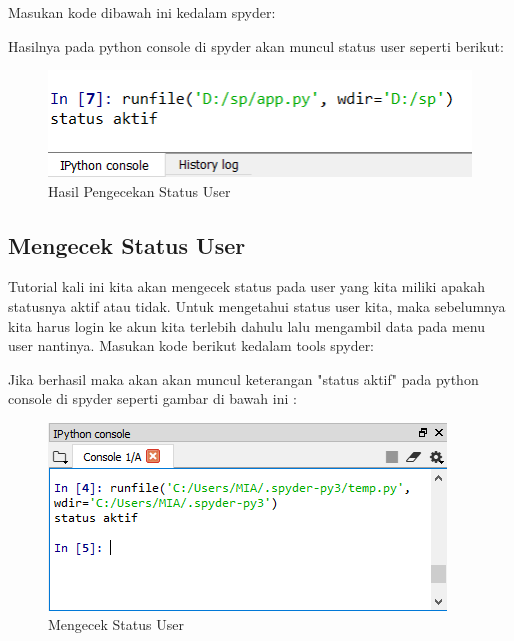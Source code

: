 Masukan kode dibawah ini kedalam spyder:


\newpage
Hasilnya pada python console di spyder akan muncul status user seperti berikut:
\begin{figure}[h]
	\centering
	\includegraphics[scale=0.7]{figures/9StatusUser}
	\caption{Hasil Pengecekan Status User}
\end{figure}

\newpage
\subsection{Mengecek Status User}
Tutorial kali ini kita akan mengecek status pada user yang kita miliki apakah statusnya aktif atau tidak. Untuk mengetahui status user kita, maka sebelumnya kita harus login ke akun kita terlebih dahulu lalu mengambil data pada menu user nantinya.
Masukan kode berikut kedalam tools spyder:


\newpage
Jika berhasil maka akan akan muncul keterangan "status aktif" pada python console di spyder seperti gambar di bawah ini :
\begin{figure}[h]
	\centering
	\includegraphics[scale=0.6]{figures/statususermia}
	\caption{Mengecek Status User}
\end{figure}


\newpage
